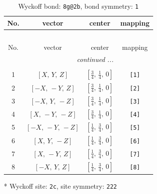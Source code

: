 \documentclass[fleqn,8pt]{jsarticle}
\begin{document}
\renewcommand{\arraystretch}{1.2}
\begin{longtable}{cccc}
\caption{Wyckoff bond: {\tt 8g@2b}, bond symmetry: {\tt 1}}
 \\
 \hline \hline
No. & vector & center & mapping \\ \hline \endfirsthead

\multicolumn{3}{l}{\tablename\ \thetable{}} \\
 \hline \hline
No. & vector & center & mapping \\ \hline \endhead

 \hline \hline
\multicolumn{3}{r}{\footnotesize\it continued ...} \\ \endfoot

 \hline \hline
\multicolumn{3}{r}{} \\ \endlastfoot

1 & $\left[ X,\, Y,\, Z \right]$ & $\left[ \frac{3}{4},\, \frac{1}{4},\, 0 \right]$ & {\tt [1]} \\ \hline
2 & $\left[ - X,\, - Y,\, Z \right]$ & $\left[ \frac{3}{4},\, \frac{1}{4},\, 0 \right]$ & {\tt [2]} \\ \hline
3 & $\left[ - X,\, Y,\, - Z \right]$ & $\left[ \frac{3}{4},\, \frac{1}{4},\, 0 \right]$ & {\tt [3]} \\ \hline
4 & $\left[ X,\, - Y,\, - Z \right]$ & $\left[ \frac{3}{4},\, \frac{1}{4},\, 0 \right]$ & {\tt [4]} \\ \hline
5 & $\left[ - X,\, - Y,\, - Z \right]$ & $\left[ \frac{1}{4},\, \frac{3}{4},\, 0 \right]$ & {\tt [5]} \\ \hline
6 & $\left[ X,\, Y,\, - Z \right]$ & $\left[ \frac{1}{4},\, \frac{3}{4},\, 0 \right]$ & {\tt [6]} \\ \hline
7 & $\left[ X,\, - Y,\, Z \right]$ & $\left[ \frac{1}{4},\, \frac{3}{4},\, 0 \right]$ & {\tt [7]} \\ \hline
8 & $\left[ - X,\, Y,\, Z \right]$ & $\left[ \frac{1}{4},\, \frac{3}{4},\, 0 \right]$ & {\tt [8]} \\
\end{longtable}
* Wyckoff site: {\tt 2c}, site symmetry: {\tt 222}
\renewcommand{\arraystretch}{1.2}
\end{document}
